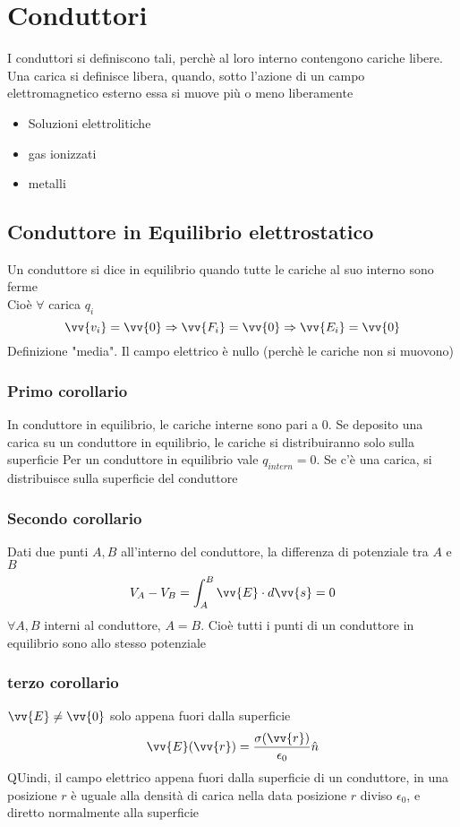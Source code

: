 \documentclass[a4paper]{report}
\begin{document}
  \section{Conduttori}
  I conduttori si definiscono tali, perchè al loro interno contengono cariche libere. Una carica si definisce libera, quando, sotto l'azione di un campo elettromagnetico esterno essa si muove più o meno liberamente
  \begin{itemize}
    \item Soluzioni elettrolitiche
      \item gas ionizzati
    \item metalli
  \end{itemize}

  \subsection{Conduttore in Equilibrio elettrostatico}
  Un conduttore si dice in equilibrio quando tutte le cariche al suo interno sono ferme\\
  Cioè $\forall$ carica $q_i$
  $$\vv{v_i} = \vv{0} \Rightarrow \vv{F_i} = \vv{0} \Rightarrow \vv{E_i} = \vv{0}$$
  Definizione "media". Il campo elettrico è nullo (perchè le cariche non si muovono)

  \subsubsection{Primo corollario}
  In conduttore in equilibrio, le cariche interne sono pari a $0$.
  Se deposito una carica su un conduttore in equilibrio, le cariche si distribuiranno solo sulla superficie
  Per un conduttore in equilibrio vale $q_{intern} =0$. Se c'è una carica, si distribuisce sulla superficie del conduttore
  \subsubsection{Secondo corollario}
  Dati due punti $A, B$ all'interno del conduttore, la differenza di potenziale tra $A$ e $B$
  $$V_A - V_B = \int_A^B \vv{E}\cdot d\vv{s}=0 $$
  $\forall A,B$ interni al conduttore, $A=B$. Cioè tutti i punti di un conduttore in equilibrio sono allo stesso potenziale
  \subsubsection{terzo corollario}
  \( \vv{E} \neq \vv{0} \) solo appena fuori dalla superficie
  $$ \vv{E}(\vv{r}) = \frac{\sigma(\vv{r})}{\epsilon_0} \hat{n} $$
  QUindi, il campo elettrico appena fuori dalla superficie di un conduttore, in una posizione $r$ è uguale alla densità di carica nella data posizione $r$ diviso $\epsilon_0$, e diretto normalmente alla superficie
\end{document}
